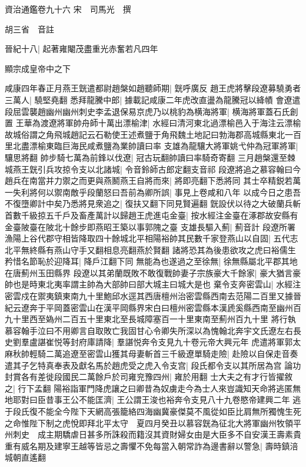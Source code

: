 資治通鑑卷九十六
宋　司馬光　撰

胡三省　音註

晉紀十八|{
	起著雍閹茂盡重光赤奮若凡四年}


顯宗成皇帝中之下

咸康四年春正月燕王皝遣都尉趙槃如趙聽師期|{
	皝呼廣反}
趙王虎將擊段遼募驍勇者三萬人|{
	驍堅堯翻}
悉拜龍騰中郎|{
	據載記咸康二年虎改直盪為龍騰冠以絳幘}
會遼遣段屈雲襲趙幽州幽州刺史李孟退保易京虎乃以桃豹為横海將軍|{
	横海將軍蓋石氏創置}
王華為渡遼將軍帥舟師十萬出漂榆津|{
	水經曰清河東北過漂榆邑入于海注云漂榆故城俗謂之角飛城趙記云石勒使王述煮鹽于角飛魏土地記曰勃海郡高城縣東北一百里北盡漂榆東臨巨海民咸煮鹽為業帥讀曰率}
支雄為龍驤大將軍姚弋仲為冠軍將軍|{
	驤思將翻}
帥步騎七萬為前鋒以伐遼|{
	冠古玩翻帥讀曰率騎奇寄翻}
三月趙槃還至棘城燕王皝引兵攻掠令支以北諸城|{
	令音鈴師古郎定翻支音祁}
段遼將追之慕容翰曰今趙兵在南當并力禦之而更與燕鬭燕王自將而來|{
	將即亮翻下悉將同}
其士卒精鋭若萬一失利將何以禦南敵乎段蘭怒曰吾前為卿所誤|{
	事見上卷咸和八年}
以成今日之患吾不復墮卿計中矣乃悉將見衆追之|{
	復扶又翻下同見賢遍翻}
皝設伏以待之大破蘭兵斬首數千級掠五千戶及畜產萬計以歸趙王虎進屯金臺|{
	按水經注金臺在涿郡故安縣有金臺陂臺在陂北十餘步即燕昭王築以事郭隗之臺}
支雄長驅入薊|{
	薊音計}
段遼所署漁陽上谷代郡守相皆降取四十餘城北平相陽裕帥其民數千家登燕山以自固|{
	五代志北平無終縣有燕山守手又翻相息亮翻燕於賢翻}
諸將恐其為後患欲攻之虎曰裕儒生矜惜名節恥於迎降耳|{
	降戶江翻下同}
無能為也遂過之至徐無|{
	徐無縣屬北平郡其地在唐薊州玉田縣界}
段遼以其弟蘭既敗不敢復戰帥妻子宗族豪大千餘家|{
	豪大猶言豪帥也是時東北夷率謂主帥為大部帥曰部大城主曰城大是也}
棄令支奔密雲山|{
	水經注密雲戍在禦夷鎮東南九十里鮑邱水逕其西唐檀州治密雲縣西南去范陽二百里又據晉紀云遼奔于平岡蓋密雲山在漢平岡縣界宋白曰檀州密雲縣本漢虒奚縣西南至幽州百九十里西至媯州二百五十里東北至長城障塞百一十里東南至薊州百九十里}
將行執慕容翰手泣曰不用卿言自取敗亡我固甘心令卿失所深以為愧翰北奔宇文氏遼左右長史劉羣盧諶崔悦等封府庫請降|{
	羣諶悦奔令支見九十卷元帝大興元年}
虎遣將軍郭太麻秋帥輕騎二萬追遼至密雲山獲其母妻斬首三千級遼單騎走險|{
	赴險以自保走音奏}
遣其子乞特真奉表及獻名馬於趙虎受之虎入令支宫|{
	段氏都令支以其所居為宫}
論功封賞各有差徙段國民二萬餘戶於司雍兖豫四州|{
	雍於用翻}
士大夫之有才行皆擢敘之|{
	行下孟翻}
陽裕詣軍門降虎讓之曰卿昔為奴虜走今為士人來豈識知天命將逃匿無地耶對曰臣昔事王公不能匡濟|{
	王公謂王浚也裕奔令支見八十九卷愍帝建興二年}
逃于段氏復不能全今陛下天網高張籠絡四海幽冀豪傑莫不風從如臣比肩無所獨愧生死之命惟陛下制之虎悅即拜北平太守　夏四月癸丑以慕容皝為征北大將軍幽州牧領平州刺史　成主期驕虐日甚多所誅殺而籍沒其資財婦女由是大臣多不自安漢王壽素貴重有威名期及建寧王越等皆忌之壽懼不免每當入朝常詐為邊書辭以警急|{
	壽時鎮涪城朝直遙翻}
